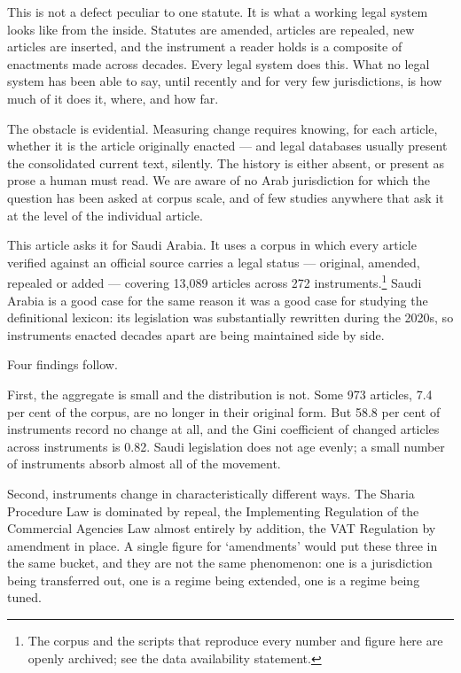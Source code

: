 \documentclass[11pt]{article}
\begin{document}
This is not a defect peculiar to one statute. It is what a working legal
system looks like from the inside. Statutes are amended, articles are
repealed, new articles are inserted, and the instrument a reader holds is a
composite of enactments made across decades. Every legal system does this.
What no legal system has been able to say, until recently and for very few
jurisdictions, is how much of it does it, where, and how far.

The obstacle is evidential. Measuring change requires knowing, for each
article, whether it is the article originally enacted --- and legal databases
usually present the consolidated current text, silently. The history is
either absent, or present as prose a human must read. We are aware of no Arab
jurisdiction for which the question has been asked at corpus scale, and of few
studies anywhere that ask it at the level of the individual article.

This article asks it for Saudi Arabia. It uses a corpus in which every article
verified against an official source carries a legal status --- original,
amended, repealed or added --- covering 13,089 articles across 272
instruments.\footnote{The corpus and the scripts that reproduce every number
and figure here are openly archived; see the data availability statement.}
Saudi Arabia is a good case for the same reason it was a good case for
studying the definitional lexicon: its legislation was substantially rewritten
during the 2020s, so instruments enacted decades apart are being maintained
side by side.

Four findings follow.

First, the aggregate is small and the distribution is not. Some 973 articles,
7.4 per cent of the corpus, are no longer in their original form. But 58.8 per
cent of instruments record no change at all, and the Gini coefficient of
changed articles across instruments is 0.82. Saudi legislation does not age
evenly; a small number of instruments absorb almost all of the movement.

Second, instruments change in characteristically different ways. The Sharia
Procedure Law is dominated by repeal, the Implementing Regulation of the
Commercial Agencies Law almost entirely by addition, the VAT Regulation by
amendment in place. A single figure for `amendments' would put these three
in the same bucket, and they are not the same phenomenon: one is a
jurisdiction being transferred out, one is a regime being extended, one is a
regime being tuned.
\end{document}
